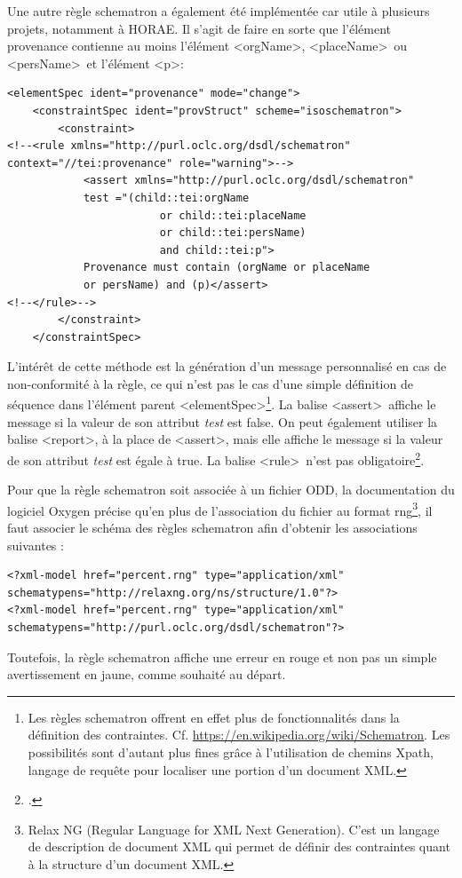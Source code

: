 \documentclass[a4paper,12pt,twoside]{book}
\begin{document}
Une autre règle schematron a également été implémentée car utile à plusieurs projets, notamment à HORAE. Il s'agit de faire en sorte que l’élément provenance contienne au moins l’élément \textless orgName\textgreater, \textless placeName\textgreater~ou \textless persName\textgreater~et l’élément \textless p\textgreater  : 
\begin{verbatim}
<elementSpec ident="provenance" mode="change">
    <constraintSpec ident="provStruct" scheme="isoschematron">
        <constraint>
<!--<rule xmlns="http://purl.oclc.org/dsdl/schematron" 
context="//tei:provenance" role="warning">-->
            <assert xmlns="http://purl.oclc.org/dsdl/schematron"
            test ="(child::tei:orgName
                        or child::tei:placeName
                        or child::tei:persName)
                        and child::tei:p">
            Provenance must contain (orgName or placeName 
            or persName) and (p)</assert>
<!--</rule>-->
        </constraint>
    </constraintSpec>
\end{verbatim}
L’intérêt de cette méthode est la génération d'un message personnalisé en cas de non-conformité à la règle, ce qui n'est pas le cas d’une simple définition de séquence dans l'élément parent \textless elementSpec\textgreater \footnote{Les règles schematron offrent en effet plus de fonctionnalités dans la définition des contraintes. Cf. \url{https://en.wikipedia.org/wiki/Schematron}. Les possibilités sont d'autant plus fines grâce à l'utilisation de chemins Xpath, langage de requête pour localiser une portion d'un document XML.}. La balise \textless assert\textgreater~affiche le message si la valeur de son attribut \textit{test} est \og false\fg{}. On peut également utiliser la balise \textless report\textgreater, à la place de \textless assert\textgreater, mais elle affiche le message si la valeur de son attribut \textit{test} est égale à \og true\fg{}. La balise \textless rule\textgreater~n’est pas obligatoire\footcite{Intro_schematron}. 

Pour que la règle schematron soit associée à un fichier ODD, la documentation du logiciel Oxygen précise qu’en plus de l’association du fichier au format rng\footnote{Relax NG (Regular Language for XML Next Generation). C'est un langage de description de document XML qui permet de définir des contraintes quant à la structure d'un document XML.}, il faut associer le schéma des règles schematron afin d'obtenir les associations suivantes :
\begin{verbatim}
<?xml-model href="percent.rng" type="application/xml" 
schematypens="http://relaxng.org/ns/structure/1.0"?>
<?xml-model href="percent.rng" type="application/xml" 
schematypens="http://purl.oclc.org/dsdl/schematron"?> 
\end{verbatim}
Toutefois, la règle schematron affiche une erreur en rouge et non pas un simple avertissement en jaune, comme souhaité au départ. \\
\end{document}
